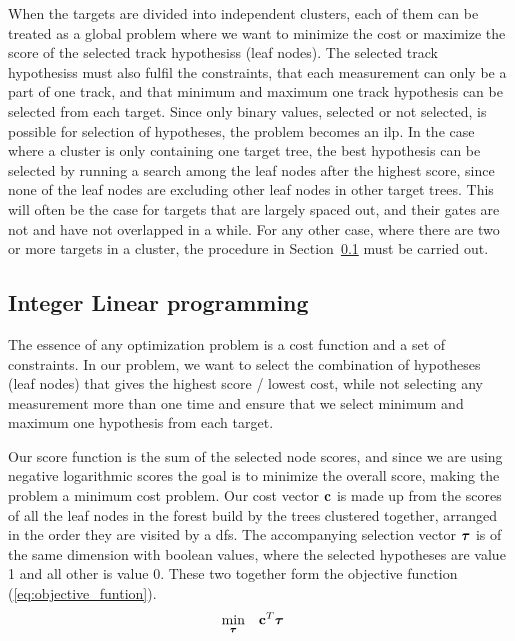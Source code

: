 When the targets are divided into independent clusters, each of them can be treated as a global problem where we want to minimize the cost or maximize the score of the selected \glspl{track hypothesis} (leaf nodes). The selected \glspl{track hypothesis} must also fulfil the constraints, that each measurement can only be a part of one track, and that minimum and maximum one track hypothesis can be selected from each target. Since only binary values, selected or not selected, is possible for selection of hypotheses, the problem becomes an \gls{ilp}. In the case where a cluster is only containing one target tree, the best hypothesis can be selected by running a search among the leaf nodes after the highest score, since none of the leaf nodes are excluding other leaf nodes in other target trees. This will often be the case for targets that are largely spaced out, and their gates are not and have not overlapped in a while. For any other case, where there are two or more targets in a cluster, the procedure in Section~\ref{subsec:integer_linear_programming} must be carried out.

\subsection{Integer Linear programming}\label{subsec:integer_linear_programming}
The essence of any optimization problem is a cost function and a set of constraints. In our problem, we want to select the combination of hypotheses (leaf nodes) that gives the highest score / lowest cost, while not selecting any measurement more than one time and ensure that we select minimum and maximum one hypothesis from each target. 

Our score function is the sum of the selected node scores, and since we are using negative logarithmic scores the goal is to minimize the overall score, making the problem a minimum cost problem. Our cost vector \(\boldsymbol{\mathbf{c}}\) is made up from the scores of all the leaf nodes in the forest build by the trees clustered together, arranged in the order they are visited by a \gls{dfs}. The accompanying selection vector \( \boldsymbol{\mathbf{\tau}} \) is of the same dimension with boolean values, where the selected hypotheses are value 1 and all other is value 0. These two together form the objective function (\ref{eq:objective_funtion}).
\begin{equation}
\begin{aligned}
& \underset{\boldsymbol{\mathbf{\tau}}}{\text{min}}
& & \boldsymbol{\mathbf{c}}^T \boldsymbol{\mathbf{\tau}}
\end{aligned}
\label{eq:objective_funtion}
\end{equation}

